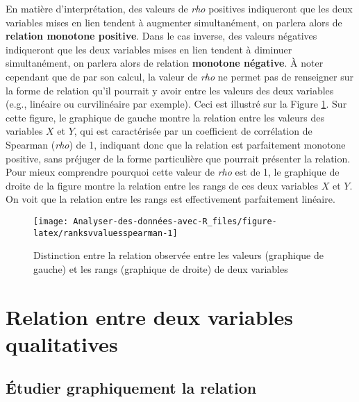 \documentclass[
  french,
]{book}
\begin{document}
En matière d'interprétation, des valeurs de \emph{rho} positives indiqueront que les deux variables mises en lien tendent à augmenter simultanément, on parlera alors de \textbf{relation monotone positive}. Dans le cas inverse, des valeurs négatives indiqueront que les deux variables mises en lien tendent à diminuer simultanément, on parlera alors de relation \textbf{monotone négative}. À noter cependant que de par son calcul, la valeur de \emph{rho} ne permet pas de renseigner sur la forme de relation qu'il pourrait y avoir entre les valeurs des deux variables (e.g., linéaire ou curvilinéaire par exemple). Ceci est illustré sur la Figure \ref{fig:ranksvvaluesspearman}. Sur cette figure, le graphique de gauche montre la relation entre les valeurs des variables \(X\) et \(Y\), qui est caractérisée par un coefficient de corrélation de Spearman (\emph{rho}) de 1, indiquant donc que la relation est parfaitement monotone positive, sans préjuger de la forme particulière que pourrait présenter la relation. Pour mieux comprendre pourquoi cette valeur de \emph{rho} est de 1, le graphique de droite de la figure montre la relation entre les rangs de ces deux variables \(X\) et \(Y\). On voit que la relation entre les rangs est effectivement parfaitement linéaire.

\begin{figure}

{\centering \texttt{[image: Analyser-des-données-avec-R\_files/figure-latex/ranksvvaluesspearman-1]} 

}

\caption{Distinction entre la relation observée entre les valeurs (graphique de gauche) et les rangs (graphique de droite) de deux variables}\label{fig:ranksvvaluesspearman}
\end{figure}

\hypertarget{relation-entre-deux-variables-qualitatives}{%
\section{Relation entre deux variables qualitatives}\label{relation-entre-deux-variables-qualitatives}}

\hypertarget{uxe9tudier-graphiquement-la-relation-1}{%
\subsection{Étudier graphiquement la relation}\label{uxe9tudier-graphiquement-la-relation-1}}
\end{document}
